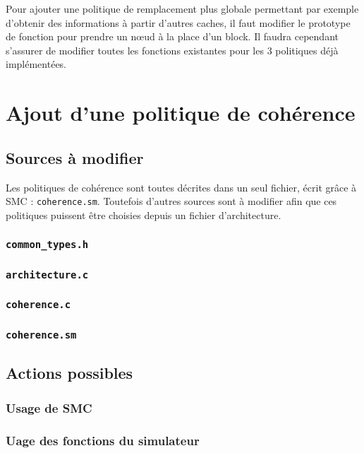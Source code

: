 Pour ajouter une politique de remplacement plus globale permettant par exemple d'obtenir des informations à partir d'autres caches, il faut modifier le prototype de fonction pour prendre un n{\oe}ud à la place d'un block. Il faudra cependant s'assurer de modifier toutes les fonctions existantes pour les $3$ politiques déjà implémentées.

\section{Ajout d'une politique de cohérence}
\label{tuto_aut}

\subsection{Sources à modifier}

Les politiques de cohérence sont toutes décrites dans un seul fichier, écrit grâce à \textsf{SMC} : \texttt{coherence.sm}. Toutefois d'autres sources sont à modifier afin que ces politiques puissent être choisies depuis un fichier d'architecture.

\subsubsection{\texttt{common\_types.h}}

\subsubsection{\texttt{architecture.c}}

\subsubsection{\texttt{coherence.c}}

\subsubsection{\texttt{coherence.sm}}

\subsection{Actions possibles}

\subsubsection{Usage de \textsf{SMC}}

\subsubsection{Uage des fonctions du simulateur}
